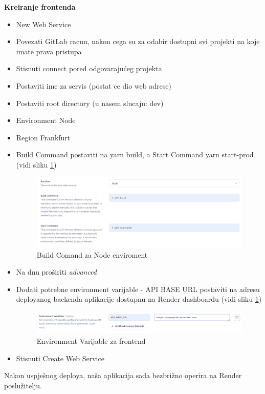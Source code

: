 \begin{packed_enum}
				\item \textbf{Kreiranje frontenda}
				\begin{itemize}
					\item New \textrightarrow Web Service
					\item Povezati GitLab racun, nakon cega su za odabir dostupni svi projekti na koje imate prava pristupa
					\item Stisnuti connect pored odgovarajućeg projekta
					\item Postaviti ime za servis (postat ce dio web adrese)
					\item Postaviti root directory (u nasem slucaju: dev)
					\item Environment Node
					\item Region Frankfurt
					\item Build Command postaviti na yarn build, a Start Command yarn start-prod (vidi sliku \ref{fig:BuildComand})
					\begin{figure}[H]
						\includegraphics[scale=0.5]{slike/BuildComand}
						\centering
						\caption{Build Comand za Node enviroment}
						\label{fig:BuildComand}
					\end{figure}	
					\item Na dnu proširiti \textit{advanced}
					\item Dodati potrebne environment varijable - API BASE URL postaviti na adresu deployanog backenda aplikacije dostupnu na Render dashboardu (vidi sliku \ref{fig:BuildComand})
						\begin{figure}[H]
							\includegraphics[scale=0.5]{slike/EnvironmentVarijableFront}
							\centering
							\caption{Environment Varijable za frontend }
							\label{fig:EnvVarfront}
						\end{figure}
					\item Stisnuti Create Web Service
				\end{itemize}
			\end{packed_enum}
			
			Nakon uspješnog deploya, naša aplikacija sada bezbrižno operira na Render poslužitelju.
		
			
			
			